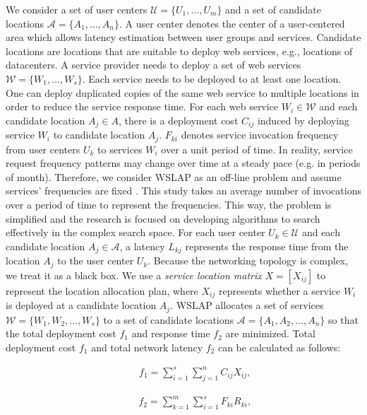 \documentclass[10pt,journal,compsoc]{IEEEtran}
\begin{document}
We consider a set of user centers $\mathcal{U }= \{U_1, \dots, U_m \}$ and a set of candidate locations $\mathcal{A} = \{A_1, \dots, A_n\}$. A user center denotes the center of a user-centered area which allows latency estimation between user groups and services. Candidate locations are locations that are suitable to deploy web services, e.g., locations of datacenters. A service provider needs to deploy a set of web services $\mathcal{W} = \{W_1, \dots, W_s\}$. Each service needs to be deployed to at least one location. One can deploy duplicated copies of the same web service to multiple locations in order to reduce the service response time. For each web service $W_i \in \mathcal{W}$ and each candidate location $A_j \in A$, there is a deployment cost $C_{ij}$ induced by deploying service $W_i$ to candidate location $A_j$. $F_{ki}$ denotes service invocation frequency from user centers $U_k$ to services $W_i$ over a unit period of time. In reality, service request frequency patterns may change over time at a steady pace (e.g. in periods of month). Therefore, we consider WSLAP as an off-line problem and assume services' frequencies are fixed \cite{Energy_9}. This study takes an average number of invocations over a period of time to represent the frequencies. This way, the problem is simplified and the research is focused on developing algorithms to search effectively in the complex search space. For each user center $U_k \in \mathcal{U}$ and each candidate location $A_j \in \mathcal{A}$, a latency $L_{kj}$ represents the response time from the location $A_j$ to the user center $U_k$. Because the networking topology is complex, we treat it as a black box.
We use a \emph{service location matrix} $X = [X_{ij}]$ to represent the location allocation plan, where $X_{ij}$ represents whether a service $W_i$ is deployed at a candidate location $A_j$. WSLAP allocates a set of services $\mathcal{W} = \{ W_1, W_2, \dots,  W_s\}$  to a set of candidate locations $\mathcal{A}= \{ A_1, A_2, \dots,  A_n \}$ so that the total deployment cost $f_1$ and response time $f_2$ are minimized. Total deployment cost $f_1$ and total network latency $f_2$ can be calculated as follows:

\begin{small}
\begin{equation} \label{eq:fit-cost}
\begin{aligned}
& & &  f_1 = \sum\limits_{i=1}^s \sum\limits_{j = 1}^n C_{ij} X_{ij},
\end{aligned}
\end{equation}

\begin{equation} \label{eq:fit-latency}
\begin{aligned}
& & & f_2 = \sum\limits_{k=1}^m \sum\limits_{i=1}^s F_{ki} R_{ki},
\end{aligned}
\end{equation}
\end{small}
\end{document}
